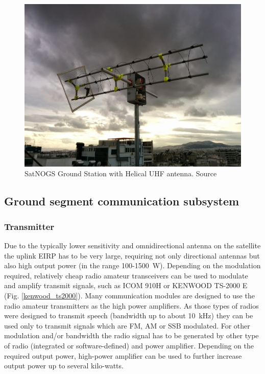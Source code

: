 \begin{figure}[H]
    \centering
    \includegraphics[width=0.45\paperwidth]{img/4/satnogs_gs.jpg}
    \caption{SatNOGS Ground Station with Helical UHF antenna. Source \cite{satnogs}}
    \label{gs:satnogs}
\end{figure}

\subsection{Ground segment communication subsystem}
\subsubsection{Transmitter}
Due to the typically lower sensitivity and omnidirectional antenna on the satellite the uplink EIRP has to be very large, requiring not only directional antennas but also high output power (in the range \si{100}-\SI{1500}{\watt}).
Depending on the modulation required, relatively cheap radio amateur transceivers can be used to modulate and amplify transmit signals, such as ICOM 910H or KENWOOD TS-2000 E (Fig. \ref{kenwood_ts2000}). Many communication modules are designed to use the radio amateur transmitters as the high power amplifiers. As those types of radios were designed to transmit speech (bandwidth up to about \SI{10}{\kHz}) they can be used only to transmit signals which are FM, AM or SSB modulated. For other modulation and/or bandwidth the radio signal has to be generated by other type of radio (integrated or software-defined) and power amplifier. Depending on the required output power, high-power amplifier can be used to further increase output power up to several kilo-watts. 

